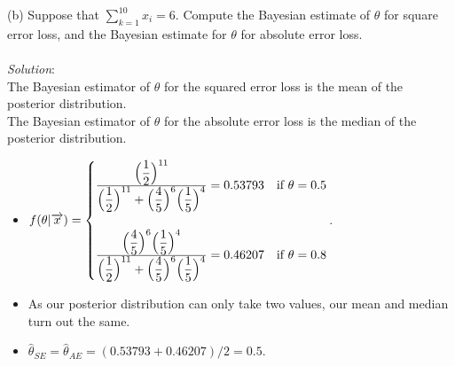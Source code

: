 \documentclass[12pt]{article}
\newcommand{\ds}{\displaystyle}
\begin{document}
\newpage

\vspace{2.5mm}

(b) Suppose that $ \sum_{k=1}^{10} x_{i} = 6 $. Compute the Bayesian estimate of $ \theta $ for square error loss, and the Bayesian estimate for $ \theta $ for absolute error loss. \\
\vspace{2.5mm} \\
\textit{Solution}:
\vspace{2.5mm} \\

\noindent
The Bayesian estimator of $ \theta $ for the squared error loss is the mean of the posterior distribution. \\
\noindent
The Bayesian estimator of $ \theta $ for the absolute error loss is the median of the posterior distribution. \\

\begin{itemize}
    \item $ \ds f(\theta | \overrightarrow{x}) = \begin{cases}
        \frac{ \ds \Bigl( \frac{1}{2} \Bigr)^{11} }{ \ds \Bigl( \frac{1}{2} \Bigr)^{11} + \Bigl( \frac{4}{5} \Bigr)^{6} \Bigl( \frac{1}{5} \Bigr)^{4} } =
        0.53793 & \text{if} \ \theta = 0.5 \\
        \ & \ \\
        \frac{ \ds \Bigl( \frac{4}{5} \Bigr)^{6} \Bigl( \frac{1}{5} \Bigr)^{4} }{ \ds \Bigl( \frac{1}{2} \Bigr)^{11} + \Bigl( \frac{4}{5} \Bigr)^{6} \Bigl( \frac{1}{5} \Bigr)^{4} } =
        0.46207 & \text{if} \ \theta = 0.8
    \end{cases} $. \\
    \item As our posterior distribution can only take two values, our mean and median turn out the same.
    \item $ \ds \hat{\theta}_{SE} = \hat{\theta}_{AE} = (0.53793 + 0.46207) / 2 = 0.5 $.
\end{itemize}

\vspace{2.5mm}
\end{document}
